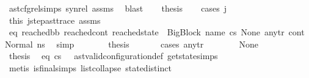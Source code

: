 \begin{isabellebody}
\ ast{\isacharunderscore}{\kern0pt}cfg{\isacharunderscore}{\kern0pt}rel{\isachardot}{\kern0pt}simps\ syn{\isacharunderscore}{\kern0pt}rel\ assms{\isacharparenleft}{\kern0pt}{}{\isacharparenright}{\kern0pt}\ \isamarkupfalse%
\ blast\isanewline
\ \ \isamarkupfalse%
\ {\isacharquery}{\kern0pt}thesis\isanewline
\ \ \isamarkupfalse%
\ {\isacharparenleft}{\kern0pt}cases\ j{\isacharparenright}{\kern0pt}\isanewline
\ \ \ \ \isamarkupfalse%
\ {}\isanewline
\ \ \ \ \isamarkupfalse%
\ this\ j{\isacharunderscore}{\kern0pt}step{\isacharunderscore}{\kern0pt}ast{\isacharunderscore}{\kern0pt}trace\ assms{\isacharparenleft}{\kern0pt}{}{\isacharparenright}{\kern0pt}\ \isanewline
\ \ \ \ \isamarkupfalse%
\ eq{\isacharcolon}{\kern0pt}\ {\isachardoublequoteopen}{\isacharparenleft}{\kern0pt}reached{\isacharunderscore}{\kern0pt}bb{\isacharcomma}{\kern0pt}\ reached{\isacharunderscore}{\kern0pt}cont{\isacharcomma}{\kern0pt}\ reached{\isacharunderscore}{\kern0pt}state{\isacharparenright}{\kern0pt}\ {\isacharequal}{\kern0pt}\ {\isacharparenleft}{\kern0pt}{\isacharparenleft}{\kern0pt}BigBlock\ name\ cs{}\ None\ any{\isacharunderscore}{\kern0pt}tr{\isacharparenright}{\kern0pt}{\isacharcomma}{\kern0pt}\ cont{}{\isacharcomma}{\kern0pt}\ {\isacharparenleft}{\kern0pt}Normal\ ns{}{\isacharparenright}{\kern0pt}{\isacharparenright}{\kern0pt}{\isachardoublequoteclose}\ \isamarkupfalse%
\ simp\isanewline
\ \ \ \ \isamarkupfalse%
\ \isamarkupfalse%
\ {\isacharquery}{\kern0pt}thesis\ \isanewline
\ \ \ \ \isamarkupfalse%
\ {\isacharparenleft}{\kern0pt}cases\ any{\isacharunderscore}{\kern0pt}tr{\isacharparenright}{\kern0pt}\isanewline
\ \ \ \ \ \ \isamarkupfalse%
\ None\isanewline
\ \ \ \ \ \ \isamarkupfalse%
\ \isamarkupfalse%
\ {\isacharquery}{\kern0pt}thesis\ \isamarkupfalse%
\ eq\ {\isacartoucheopen}cs{}\ {\isasymnoteq}\ {\isacharbrackleft}{\kern0pt}{\isacharbrackright}{\kern0pt}{\isacartoucheclose}\ ast{\isacharunderscore}{\kern0pt}valid{\isacharunderscore}{\kern0pt}configuration{\isacharunderscore}{\kern0pt}def\ get{\isacharunderscore}{\kern0pt}state{\isachardot}{\kern0pt}simps\isanewline
\ \ \ \ \ \ \ \ \isamarkupfalse%
\ {\isacharparenleft}{\kern0pt}metis\ is{\isacharunderscore}{\kern0pt}final{\isachardot}{\kern0pt}simps{\isacharparenleft}{\kern0pt}{}{\isacharparenright}{\kern0pt}\ list{\isachardot}{\kern0pt}collapse\ state{\isachardot}{\kern0pt}distinct{\isacharparenleft}{\kern0pt}{}{\isacharparenright}{\kern0pt}{\isacharparenright}{\kern0pt}\isanewline

\end{isabellebody}
